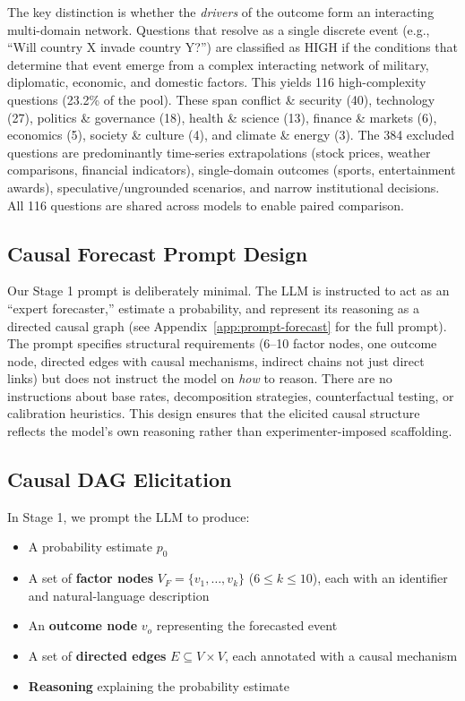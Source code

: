 \documentclass[11pt]{article}
\begin{document}
The key distinction is whether the \emph{drivers} of the outcome form an interacting multi-domain network. Questions that resolve as a single discrete event (e.g., ``Will country X invade country Y?'') are classified as HIGH if the conditions that determine that event emerge from a complex interacting network of military, diplomatic, economic, and domestic factors. 
This yields 116 high-complexity questions (23.2\% of the pool). These span conflict \& security (40), technology (27), politics \& governance (18), health \& science (13), finance \& markets (6), economics (5), society \& culture (4), and climate \& energy (3). The 384 excluded questions are predominantly time-series extrapolations (stock prices, weather comparisons, financial indicators), single-domain outcomes (sports, entertainment awards), speculative/ungrounded scenarios, and narrow institutional decisions. All 116 questions are shared across models to enable paired comparison.

\subsection{Causal Forecast Prompt Design}
\label{sec:superforecasting}

Our Stage 1 prompt is deliberately minimal. The LLM is instructed to act as an ``expert forecaster,'' estimate a probability, and represent its reasoning as a directed causal graph (see Appendix~\ref{app:prompt-forecast} for the full prompt). The prompt specifies structural requirements (6--10 factor nodes, one outcome node, directed edges with causal mechanisms, indirect chains not just direct links) but does not instruct the model on \emph{how} to reason. There are no instructions about base rates, decomposition strategies, counterfactual testing, or calibration heuristics. This design ensures that the elicited causal structure reflects the model's own reasoning rather than experimenter-imposed scaffolding.

\subsection{Causal DAG Elicitation}
\label{sec:dag}

In Stage 1, we prompt the LLM to produce:
\begin{itemize}
    \item A probability estimate $p_0$
    \item A set of \textbf{factor nodes} $V_F = \{v_1, \ldots, v_k\}$ ($6 \leq k \leq 10$), each with an identifier and natural-language description
    \item An \textbf{outcome node} $v_o$ representing the forecasted event
    \item A set of \textbf{directed edges} $E \subseteq V \times V$, each annotated with a causal mechanism
    \item \textbf{Reasoning} explaining the probability estimate
\end{itemize}
\end{document}
